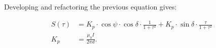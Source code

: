 Developing and refactoring the previous equation gives:

\begin{equation}
\begin{aligned}
S(\tau) &= K_p \cdot \cos\psi \cdot \cos\delta \cdot \frac{1}{1+\tau^2} 
        + K_p \cdot \sin\delta \cdot \frac{\tau}{1+\tau^2} \\
K_p &=  \frac{\mu_0 I}{2 \pi d}.
\end{aligned}
\label{eq:anomaly}
\end{equation}